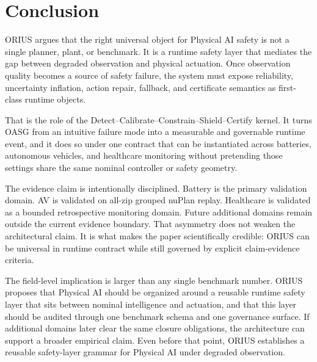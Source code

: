 \section{Conclusion}
\label{sec:ieee-conclusion}

ORIUS argues that the right universal object for Physical AI safety is not a single
planner, plant, or benchmark. It is a runtime safety layer that mediates the gap
between degraded observation and physical actuation. Once observation quality becomes a
source of safety failure, the system must expose reliability, uncertainty inflation,
action repair, fallback, and certificate semantics as first-class runtime objects.

That is the role of the Detect--Calibrate--Constrain--Shield--Certify kernel. It turns
OASG from an intuitive failure mode into a measurable and governable runtime event, and
it does so under one contract that can be instantiated across batteries, autonomous
vehicles, and healthcare monitoring without pretending those settings share the same
nominal controller or safety geometry.

The evidence claim is intentionally disciplined. Battery is the primary validation
domain. AV is validated on all-zip grouped nuPlan replay. Healthcare is validated as a
bounded retrospective monitoring domain. Future additional domains remain outside the
current evidence boundary. That asymmetry does not weaken the architectural claim. It
is what makes the paper scientifically credible: ORIUS can be universal in runtime
contract while still governed by explicit claim-evidence criteria.

The field-level implication is larger than any single benchmark number. ORIUS proposes
that Physical AI should be organized around a reusable runtime safety layer that sits
between nominal intelligence and actuation, and that this layer should be audited
through one benchmark schema and one governance surface. If additional domains later
clear the same closure obligations, the architecture can support a broader empirical
claim. Even before that point, ORIUS establishes a reusable safety-layer grammar for
Physical AI under degraded observation.
